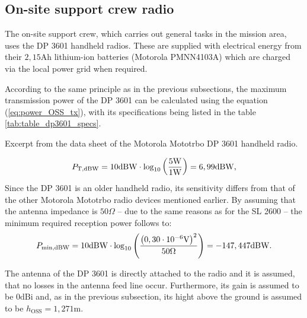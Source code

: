 \subsection{On-site support crew radio}
The on-site support crew, which carries out general tasks in the mission area, uses the DP 3601 handheld radios. These are supplied with electrical energy from their $2,15\mathrm{Ah}$ lithium-ion batteries (Motorola PMNN4103A) which are charged via the local power grid when required.  

According to the same principle as in the previous subsections, the maximum transmission power of the DP 3601 can be calculated using the equation (\ref{eq:power_OSS_tx}), with its specifications being listed in the table \ref{tab:table_dp3601_specs}.
\begin{table}[h!] %
	\centering
	
	\caption{Excerpt from the data sheet of the Motorola Mototrbo DP 3601 handheld radio. \cite{DP3601:2010}}
	\label{tab:table_dp3601_specs}
\end{table}
\begin{equation} \label{eq:power_OSS_tx}
	\centering
	P_\mathrm{T,dBW} =  10\mathrm{dBW} \cdot \log_{10} \left( \dfrac{5\mathrm{W}}{1\mathrm{W}} \right) = 6,99\mathrm{dBW}\text{,}
\end{equation}
Since the DP 3601 is an older handheld radio, its sensitivity differs from that of the other Motorola Mototrbo radio devices mentioned earlier. By assuming that the antenna impedance is $50\Omega$ -- due to the same reasons as for the SL 2600 -- the minimum required reception power follows to:
\begin{equation} \label{eq:power_OSS_min}
	\centering
	P_\mathrm{min,dBW} = 10\mathrm{dBW} \cdot \log_{10} \left( \dfrac{\left(0,30\cdot10^{-6}\mathrm{V}\right)^2}{50\Omega} \right) = -147,447\mathrm{dBW}\text{.}
\end{equation}

The antenna of the DP 3601 is directly attached to the radio and it is assumed, that no losses in the antenna feed line occur. Furthermore, its gain is assumed to be $0\mathrm{dBi}$ and, as in the previous subsection, its hight above the ground is assumed to be $h_\mathrm{OSS} = 1,271\mathrm{m}$.




